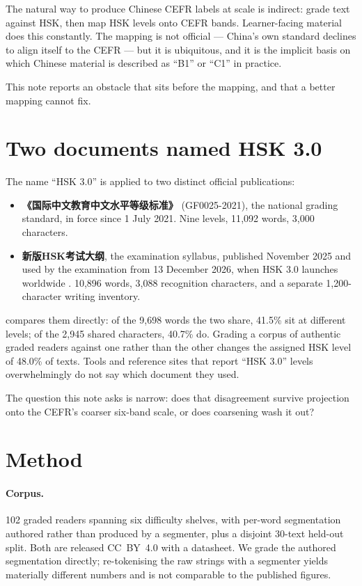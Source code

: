 \documentclass[11pt]{article}
\begin{document}
The natural way to produce Chinese CEFR labels at scale is indirect: grade text
against HSK, then map HSK levels onto CEFR bands. Learner-facing material does
this constantly. The mapping is not official --- China's own standard declines
to align itself to the CEFR --- but it is ubiquitous, and it is the implicit
basis on which Chinese material is described as ``B1'' or ``C1'' in practice.

This note reports an obstacle that sits before the mapping, and that a better
mapping cannot fix.

\section{Two documents named HSK 3.0}
\label{sec:two}

The name ``HSK 3.0'' is applied to two distinct official publications:

\begin{itemize}
\item \textbf{《国际中文教育中文水平等级标准》} (GF0025-2021), the national
grading standard, in force since 1 July 2021. Nine levels, 11{,}092 words,
3{,}000 characters.
\item \textbf{新版HSK考试大纲}, the examination syllabus, published November
2025 and used by the examination from 13 December 2026, when HSK 3.0 launches
worldwide \citep{smec2026launch}. 10{,}896 words, 3{,}088 recognition
characters, and a separate 1{,}200-character writing inventory.
\end{itemize}

\citet{serrano2026whichhsk} compares them directly: of the 9{,}698 words the
two share, 41.5\% sit at different levels; of the 2{,}945 shared characters,
40.7\% do. Grading a corpus of authentic graded readers against one rather than
the other changes the assigned HSK level of 48.0\% of texts. Tools and
reference sites that report ``HSK 3.0'' levels overwhelmingly do not say which
document they used.

The question this note asks is narrow: does that disagreement survive
projection onto the CEFR's coarser six-band scale, or does coarsening wash it
out?

\section{Method}

\paragraph{Corpus.} 102 graded readers spanning six difficulty shelves, with
per-word segmentation authored rather than produced by a segmenter, plus a
disjoint 30-text held-out split. Both are released CC~BY~4.0 with a datasheet.
We grade the authored segmentation directly; re-tokenising the raw strings with
a segmenter yields materially different numbers and is not comparable to the
published figures.
\end{document}
